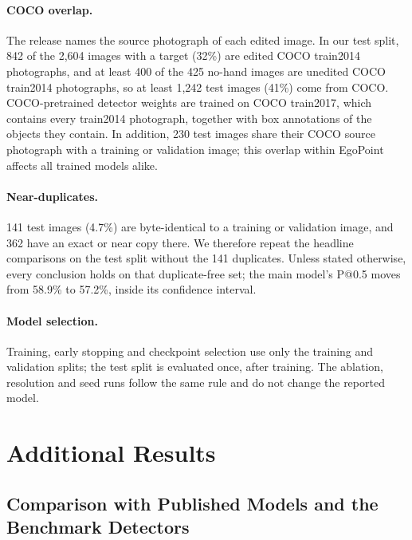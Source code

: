 \paragraph{COCO overlap.} The release names the source photograph of each edited image. In our test split, 842 of the 2,604 images with a target (32\%) are edited COCO train2014 photographs, and at least 400 of the 425 no-hand images are unedited COCO train2014 photographs, so at least 1,242 test images (41\%) come from COCO. COCO-pretrained detector weights are trained on COCO train2017, which contains every train2014 photograph, together with box annotations of the objects they contain. In addition, 230 test images share their COCO source photograph with a training or validation image; this overlap within EgoPoint affects all trained models alike.

\paragraph{Near-duplicates.} 141 test images (4.7\%) are byte-identical to a training or validation image, and 362 have an exact or near copy there. We therefore repeat the headline comparisons on the test split without the 141 duplicates. Unless stated otherwise, every conclusion holds on that duplicate-free set; the main model's P@0.5 moves from 58.9\% to 57.2\%, inside its confidence interval.

\paragraph{Model selection.} Training, early stopping and checkpoint selection use only the training and validation splits; the test split is evaluated once, after training. The ablation, resolution and seed runs follow the same rule and do not change the reported model.

\section{Additional Results}\label{app:extra}

\subsection{Comparison with Published Models and the Benchmark Detectors}\label{app:comparison}

